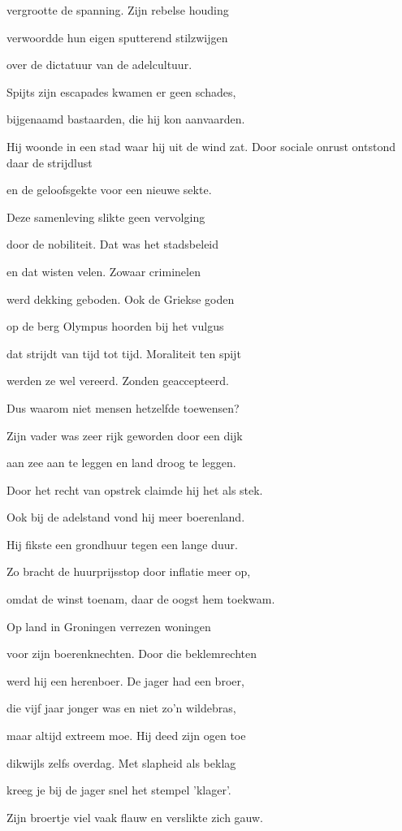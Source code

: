 vergrootte de spanning.
Zijn rebelse houding

verwoordde hun eigen
sputterend stilzwijgen

over de dictatuur
van de adelcultuur.

Spijts zijn escapades
kwamen er geen schades,

bijgenaamd bastaarden,
die hij kon aanvaarden.

Hij woonde in een stad
waar hij uit de wind zat.
Door sociale onrust
ontstond daar de strijdlust

en de geloofsgekte
voor een nieuwe sekte.

Deze samenleving
slikte geen vervolging

door de nobiliteit.
Dat was het stadsbeleid

en dat wisten velen.
Zowaar criminelen

werd dekking geboden.
Ook de Griekse goden

op de berg Olympus
hoorden bij het vulgus

dat strijdt van tijd tot tijd.
Moraliteit ten spijt

werden ze wel vereerd.
Zonden geaccepteerd.

Dus waarom niet mensen
hetzelfde toewensen?

Zijn vader was zeer rijk
geworden door een dijk

aan zee aan te leggen
en land droog te leggen.

Door het recht van opstrek
claimde hij het als stek.

Ook bij de adelstand
vond hij meer boerenland.

Hij fikste een grondhuur
tegen een lange duur.

Zo bracht de huurprijsstop
door inflatie meer op,

omdat de winst toenam,
daar de oogst hem toekwam.

Op land in Groningen
verrezen woningen

voor zijn boerenknechten.
Door die beklemrechten

werd hij een herenboer.
De jager had een broer,

die vijf jaar jonger was
en niet zo’n wildebras,

maar altijd extreem moe.
Hij deed zijn ogen toe

dikwijls zelfs overdag.
Met slapheid als beklag

kreeg je bij de jager
snel het stempel 'klager'.

Zijn broertje viel vaak flauw
en verslikte zich gauw.

